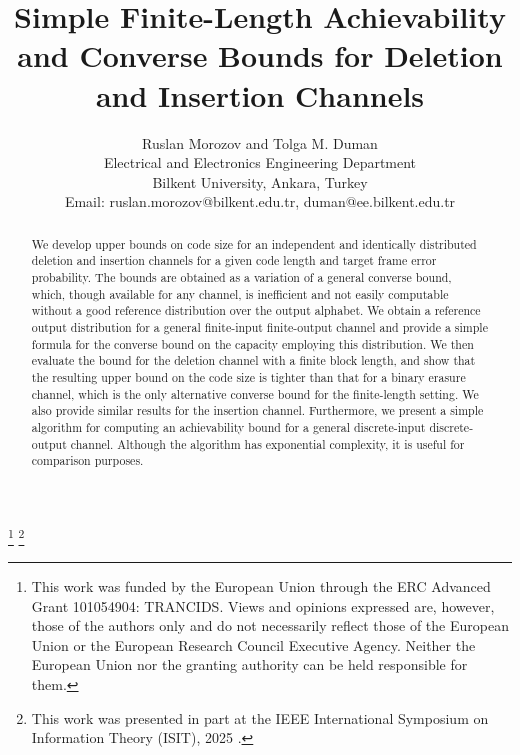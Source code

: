 \documentclass[journal, twocol]{IEEEtran}
\begin{document}

\title{Simple Finite-Length Achievability and Converse Bounds for Deletion and Insertion Channels}
\author{
 Ruslan Morozov and Tolga M. Duman \\
 Electrical and Electronics Engineering Department\\
 Bilkent University, Ankara, Turkey\\
 Email: ruslan.morozov@bilkent.edu.tr, duman@ee.bilkent.edu.tr}
\maketitle
{\let\thefootnote\relax\footnote{{This work was funded by the European Union through the ERC Advanced Grant 101054904: TRANCIDS. Views and opinions expressed are, however, those of the authors only and do not necessarily reflect those of the European Union or the European Research Council Executive Agency. Neither the European Union nor the granting authority can be held responsible for them.}}}
{\let\thefootnote\relax\footnote{This work was presented in part at the IEEE International Symposium on Information Theory (ISIT), 2025 \cite{morozov-duman-isit2025}.}}

\begin{abstract}
We develop upper bounds on code size for an independent and identically distributed deletion and insertion channels for a given code length and target frame error probability. 
The bounds are obtained as a variation of a general converse bound, which, though available for any channel, is inefficient and not easily computable without a good reference distribution over the output alphabet. 
We obtain a reference output distribution for a general finite-input finite-output channel and provide a simple formula for the converse bound on the capacity employing this distribution. 
We then evaluate the bound for the deletion channel with a finite block length, and show that the resulting upper bound on the code size is tighter than that for a binary erasure channel, which is the only alternative converse bound for the finite-length setting.
We also provide similar results for the insertion channel.
Furthermore, we present a simple algorithm for computing an achievability bound for a general discrete-input discrete-output channel.
Although the algorithm has exponential complexity, it is useful for comparison purposes.
\end{abstract}

\end{document}
